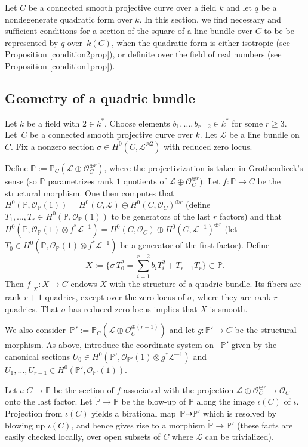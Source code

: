 \documentclass{amsart}
\theoremstyle{definition}
\theoremstyle{remark}
\numberwithin{equation}{section}
\def\P{\mathbb P}
\def\cL{\mathcal{L}}
\def\cO{\mathcal{O}}
\def\wP{\widetilde{\mathbb{P}}}
\begin{document}
 Let $C$ be a connected smooth projective curve over a field $k$ and let $q$ be a nondegenerate quadratic form over $k$. In this section, we find necessary and sufficient conditions for a section of the square of a line bundle over $C$ to be be represented by $q$ over~$k(C)$, when the quadratic form is either isotropic (see Proposition \ref{condition2prop}), or definite over the field of real numbers (see Proposition \ref{condition1prop}).


\subsection{Geometry of a quadric bundle}
\label{parquadrics}

Let $k$ be a field with $2\in k^*$. 
Choose elements $b_1,\dots,b_{r-2}\in k^*$ for some $r\geq 3$.
 Let~$C$ be a connected smooth projective curve over $k$. 
 Let $\cL$ be a line bundle on~$C$. Fix a nonzero section $\sigma\in H^0(C,\cL^{\otimes 2})$ with reduced zero locus.

Define $\P:=\P_C(\cL\oplus\cO_C^{\oplus r})$, where the projectivization is taken in Grothendieck's sense (so $\P$ parametrizes rank $1$ quotients of $\cL\oplus\cO_C^{\oplus r}$). Let $f:\P\to C$ be the structural morphism. One then computes that ${H^0(\P,\cO_\P(1))=H^0(C,\cL)\oplus H^0(C,\cO_C)^{\oplus r}}$ (define $T_1,\dots,T_r\in H^0(\P,\cO_\P(1))$ to be generators of the last $r$ factors) and that $H^0(\P,\cO_\P(1)\otimes f^*\cL^{-1})= H^0(C,\cO_C)\oplus H^0(C,\cL^{-1})^{\oplus r}$
(let $T_0\in H^0(\P,\cO_\P(1)\otimes f^*\cL^{-1})$ be a generator of the first factor). Define
\begin{equation}
\label{eqX}
X:=\{\sigma\, T_0^2=\sum_{i=1}^{r-2}b_iT_i^2+T_{r-1}T_r\}\subset \P.
\end{equation}
Then $f|_X:X\to C$ endows $X$ with the structure of a quadric bundle. Its fibers are rank $r+1$ quadrics, except over the zero locus of $\sigma$, where they are rank $r$ quadrics. That $\sigma$ has reduced zero locus implies that $X$ is smooth.

We also consider~$\P':=\P_C(\cL\oplus\cO_C^{\oplus (r-1)})$ and let $g:\P'\to C$ be the structural morphism. As above, introduce the coordinate system on ~$\P'$ given by the canonical sections $U_0\in H^0(\P',\cO_{\P'}(1)\otimes g^*\cL^{-1})$ and $U_1,\dots, U_{r-1}\in H^0(\P',\cO_{\P'}(1))$.

Let $\iota:C\to \P$ be the section of $f$ associated with the projection ${\cL\oplus\cO_C^{\oplus r}\to\cO_C}$ onto the last factor. Let $\widetilde{\P}\to\P$ be the blow-up of $\P$ along the image $\iota(C)$ of $\iota$. 
Projection from $\iota(C)$ yields a birational map~$\P\dashrightarrow\P'$ which is resolved by blowing up $\iota(C)$, and hence gives rise to a morphism $\wP\to\P'$ 
(these facts are easily checked locally, over open subsets of $C$ where $\cL$ can be trivialized).
\end{document}
